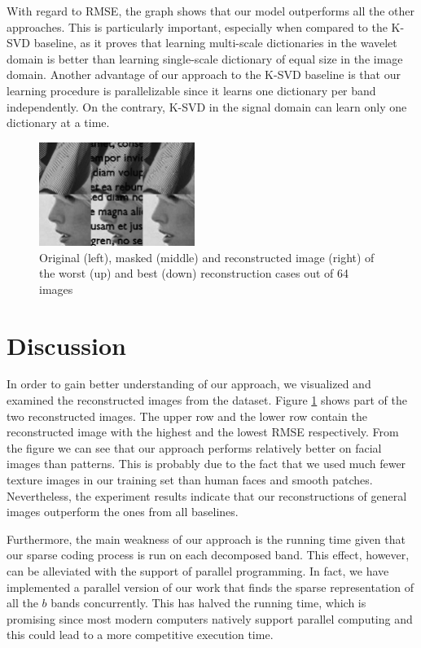 \documentclass[conference]{IEEEtran}
\begin{document}
  With regard to RMSE, the graph shows that our model outperforms all the other approaches. This is particularly important, especially when compared to the K-SVD baseline, as it proves that learning multi-scale dictionaries in the wavelet domain is better than learning single-scale dictionary of equal size in the image domain. Another advantage of our approach to the K-SVD baseline is that our learning procedure is parallelizable since it learns one dictionary per band independently. On the contrary, K-SVD in the signal domain can learn only one dictionary at a time.

\begin{figure}[h]
\centering
\includegraphics[width=0.45\textwidth]{image_comparison}
\caption{Original (left), masked (middle) and reconstructed image (right) of the worst (up) and best (down) reconstruction cases out of 64 images}
\label{image_comparison}
\end{figure}

\section{Discussion}\label{discussion}
In order to gain better understanding of our approach, we visualized and examined the reconstructed images from the dataset. Figure \ref{image_comparison} shows part of the two reconstructed images. The upper row and the lower row contain the reconstructed image with the highest and the lowest RMSE respectively. From the figure we can see that our approach performs relatively better on facial images than patterns. This is probably due to the fact that we used much fewer texture images in our training set than human faces and smooth patches. Nevertheless, the experiment results indicate that our reconstructions of general images outperform the ones from all baselines.

Furthermore, the main weakness of our approach is the running time given that our sparse coding process is run on each decomposed band. This effect, however, can be alleviated with the support of parallel programming. In fact, we have implemented a parallel version of our work that finds the sparse representation of all the $b$ bands concurrently. This has halved the running time, which is promising since most modern computers natively support parallel computing and this could lead to a more competitive execution time.
\end{document}
